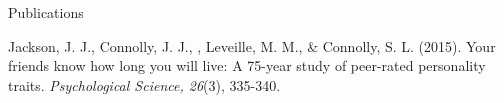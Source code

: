 \begin{rSection}{\textrm{Publications}}
\begin{etaremune}
%
\item Jackson, J. J., Connolly, J. J., \meb, Leveille, M. M., \& Connolly, S. L. (2015). Your friends know how long you will live: A 75-year study of peer-rated personality traits. \textit{Psychological Science, 26}(3), 335-340. 
\end{etaremune}\end{rSection}%